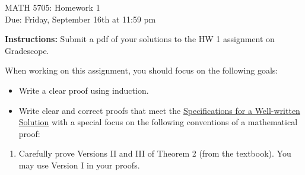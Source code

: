 \documentclass[12pt]{article}
\begin{document}
\begin{center}
{\Large MATH 5705: Homework 1}\\
Due: Friday, September 16th at 11:59 pm \\


\end{center}
{\bf Instructions:} Submit a pdf of your solutions to the HW 1 assignment on Gradescope. 

When working on this assignment, you should focus on the following goals:
\begin{itemize}
\item Write a clear proof using induction. 
\item Write clear and correct proofs that meet the \href{https://docs.google.com/document/d/18LfQoqi6BsY2VdAlpC5xdYEA2rxSGoH0891nVec4_Os/edit?usp=sharing}{Specifications for a Well-written Solution} with a special focus on the following conventions of a mathematical proof:
\end{itemize}


\begin{enumerate}


\item Carefully prove Versions II and III of Theorem 2 (from the textbook).  You may use Version I in your proofs.  
\end{enumerate}
\end{document}
